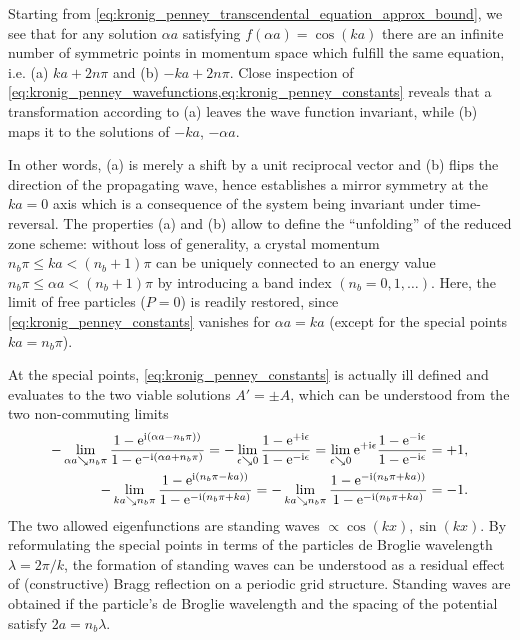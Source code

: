 Starting from \cref{eq:kronig_penney_transcendental_equation_approx_bound}, we see that for any solution $\alpha a$ satisfying $f(\alpha a)=\cos(k a)$ there are an infinite number of symmetric points in momentum space which fulfill the same equation, i.e. (a) $ka + 2n\pi$ and (b) $-ka+2n\pi$.
Close inspection of \cref{eq:kronig_penney_wavefunctions,eq:kronig_penney_constants} reveals that a transformation according to (a) leaves the wave function invariant, while (b) maps it to the solutions of $-ka$, $-\alpha a$.

In other words, (a) is merely a shift by a unit reciprocal vector and (b) flips the direction of the propagating wave, hence establishes a mirror symmetry at the $ka=0$ axis which is a consequence of the system being invariant under time-reversal.
The properties (a) and (b) allow to define the ``unfolding'' of the reduced zone scheme:
without loss of generality, a crystal momentum $n_b\pi\leq ka<(n_b+1)\pi$ can be uniquely connected to an energy value $n_b\pi\leq \alpha a<(n_b+1)\pi$ by introducing a band index $(n_b=0,1,\dots)$.
Here, the limit of free particles ($P=0$) is readily restored, since \cref{eq:kronig_penney_constants} vanishes for $\alpha a = ka$ (except for the special points $ka=n_b\pi$).

At the special points, \cref{eq:kronig_penney_constants} is actually ill defined and evaluates to the two viable solutions $A'=\pm A$, which can be understood from the two non-commuting limits
\begin{align}
    -\lim_{\alpha a \searrow n_b\pi}\frac{1-\mathrm e^{\mathrm i(\alpha a-n_b\pi))}}{1-\mathrm e^{-\mathrm i(\alpha a+n_b\pi)}}
    =
    -\lim_{\epsilon\searrow0}\frac{1-\mathrm e^{+\mathrm i\epsilon}}{1-\mathrm e^{-\mathrm i\epsilon}}
    =
    \lim_{\epsilon\searrow0}\mathrm e^{+\mathrm i\epsilon}\frac{1-\mathrm e^{-\mathrm i\epsilon}}{1-\mathrm e^{-\mathrm i\epsilon}}
    =
    +1,
    \\
    -\lim_{k a \searrow n_b\pi}\frac{1-\mathrm e^{\mathrm i(n_b\pi - ka))}}{1-\mathrm e^{-\mathrm i(n_b\pi+ka)}}
    =
    -\lim_{k a \searrow n_b\pi}\frac{1-\mathrm e^{-\mathrm i(n_b\pi + ka))}}{1-\mathrm e^{-\mathrm i(n_b\pi+ka)}}
    =
    -1.
\end{align}
The two allowed eigenfunctions are standing waves $\propto \cos(kx),\sin(kx)$.
By reformulating the special points in terms of the particles de Broglie wavelength $\lambda=2\pi/k$, the formation of standing waves can be understood as a residual effect of (constructive) Bragg reflection on a periodic grid structure.
Standing waves are obtained if the particle's de Broglie wavelength and the spacing of the potential satisfy $2a=n_b\lambda$.

